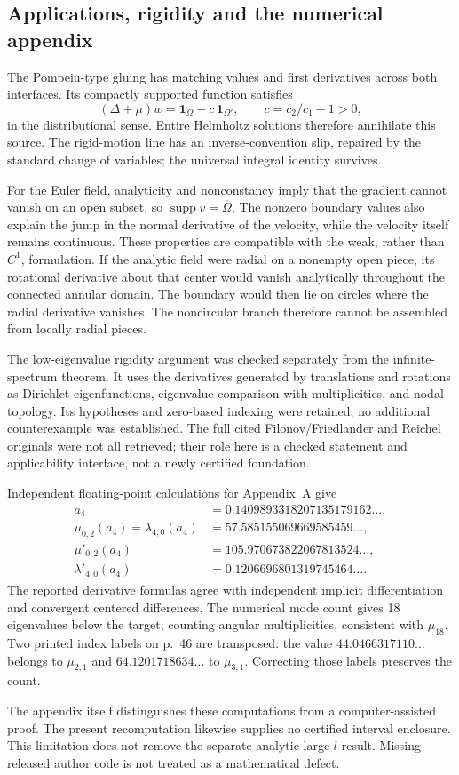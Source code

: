 \documentclass[10pt]{article}
\begin{document}
\subsection*{Applications, rigidity and the numerical appendix}
The Pompeiu-type gluing has matching values and first derivatives across both interfaces. Its compactly supported function satisfies \[(\Delta+\mu)w=\mathbf{1}_{\Omega}-c\,\mathbf{1}_{\Omega'},
 \qquad c=c_2/c_1-1>0,\] in the distributional sense. Entire Helmholtz solutions therefore annihilate this source. The rigid-motion line has an inverse-convention slip, repaired by the standard change of variables; the universal integral identity survives.\par
For the Euler field, analyticity and nonconstancy imply that the gradient cannot vanish on an open subset, so \(\operatorname{supp}v=\overline\Omega\). The nonzero boundary values also explain the jump in the normal derivative of the velocity, while the velocity itself remains continuous. These properties are compatible with the weak, rather than \(C^1\), formulation. If the analytic field were radial on a nonempty open piece, its rotational derivative about that center would vanish analytically throughout the connected annular domain. The boundary would then lie on circles where the radial derivative vanishes. The noncircular branch therefore cannot be assembled from locally radial pieces.\par
The low-eigenvalue rigidity argument was checked separately from the infinite-spectrum theorem. It uses the derivatives generated by translations and rotations as Dirichlet eigenfunctions, eigenvalue comparison with multiplicities, and nodal topology. Its hypotheses and zero-based indexing were retained; no additional counterexample was established. The full cited Filonov/Friedlander and Reichel originals were not all retrieved; their role here is a checked statement and applicability interface, not a newly certified foundation.\par
Independent floating-point calculations for Appendix A give \[\begin{aligned}
 a_4&=0.1409893318207135179162\ldots,\\
 \mu_{0,2}(a_4)=\lambda_{4,0}(a_4)
     &=57.585155069669585459\ldots,\\
 \mu'_{0,2}(a_4)&=105.970673822067813524\ldots,\\
 \lambda'_{4,0}(a_4)&=0.1206696801319745464\ldots .
 \end{aligned}\] The reported derivative formulas agree with independent implicit differentiation and convergent centered differences. The numerical mode count gives 18 eigenvalues below the target, counting angular multiplicities, consistent with \(\mu_{18}\). Two printed index labels on p. 46 are transposed: the value \(44.0466317110\ldots\) belongs to \(\mu_{2,1}\) and \(64.1201718634\ldots\) to \(\mu_{3,1}\). Correcting those labels preserves the count.\par
The appendix itself distinguishes these computations from a computer-assisted proof. The present recomputation likewise supplies no certified interval enclosure. This limitation does not remove the separate analytic large-\(l\) result. Missing released author code is not treated as a mathematical defect.\par
\end{document}
